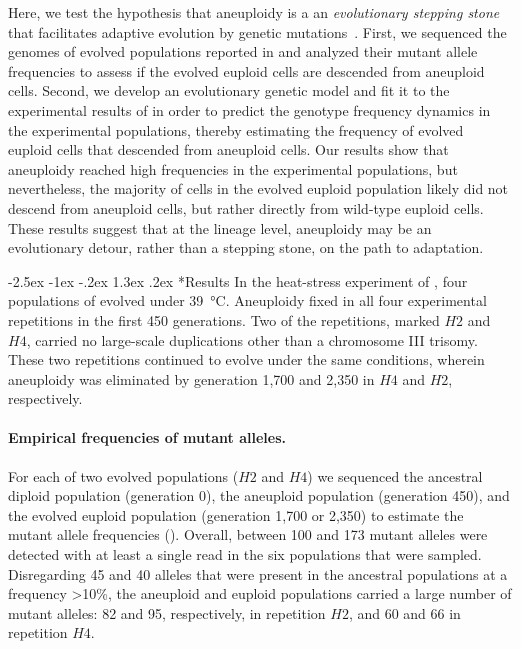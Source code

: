 \documentclass[12pt]{extarticle}
\makeatletter
\renewcommand\section{\@startsection {section}{1}{\z@}%
     {-2.5ex \@plus -1ex \@minus -.2ex}%
     {1.3ex \@plus.2ex}%
    {\Large\bfseries}}
\makeatother
\begin{document}
Here, we test the hypothesis that aneuploidy is a an \emph{evolutionary stepping stone} that facilitates adaptive evolution by genetic mutations~\citet{Yona2015}.
First, we sequenced the genomes of evolved populations reported in \citep{Yona2012} and analyzed their mutant allele frequencies to assess if the evolved euploid cells are descended from aneuploid cells.
Second, we develop an evolutionary genetic model and fit it to the experimental results of \citet{Yona2012} in order to predict the genotype frequency dynamics in the experimental populations, thereby estimating the frequency of evolved euploid cells that descended from aneuploid cells. 
Our results show that aneuploidy reached high frequencies in the experimental populations, but nevertheless, the majority of cells in the evolved euploid population likely did not descend from aneuploid cells, but rather directly from wild-type euploid cells.
These results suggest that at the lineage level, aneuploidy may be an evolutionary detour, rather than a stepping stone, on the path to adaptation.


\section*{Results}
In the heat-stress experiment of \citet{Yona2012}, four populations of \yeast evolved under \SI{39}{\celsius}.
Aneuploidy fixed in all four experimental repetitions in the first 450 generations.
Two of the repetitions, marked $H2$ and $H4$, carried no large-scale duplications other than a chromosome III trisomy.
These two repetitions continued to evolve under the same conditions, wherein aneuploidy was eliminated by generation 1,700 and 2,350 in $H4$ and $H2$, respectively.

\paragraph{Empirical frequencies of mutant alleles.} 
For each of two evolved populations ($H2$ and $H4$) we sequenced the ancestral diploid population (generation 0), the aneuploid population (generation 450), and the evolved euploid population (generation 1,700 or 2,350) to estimate the mutant allele frequencies (). 
Overall, between 100 and 173 mutant alleles were detected with at least a single read in the six populations that were sampled. 
Disregarding 45 and 40 alleles that were present in the ancestral populations at a frequency >10\%, the aneuploid and euploid populations carried a large number of mutant alleles: 82 and 95, respectively, in repetition $H2$, and 60 and 66 in repetition $H4$.
\end{document}
